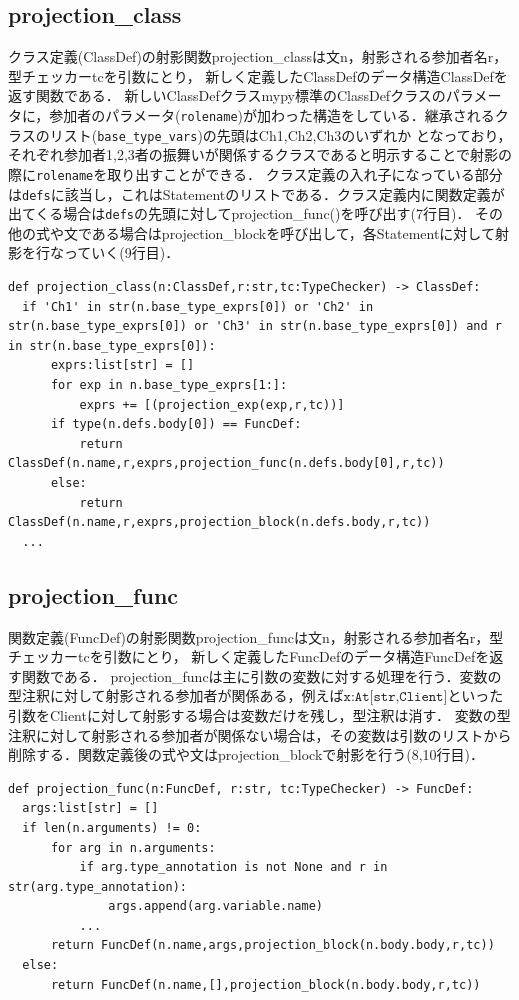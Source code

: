 \documentclass{thesis}
\begin{document}
\subsection{projection\_class}
クラス定義(ClassDef)の射影関数projection\_classは文\textsf{n}，射影される参加者名\textsf{r}，型チェッカー\textsf{tc}を引数にとり， 新しく定義したClassDefのデータ構造\textsf{ClassDef}を返す関数である．
新しいClassDefクラスmypy標準のClassDefクラスのパラメータに，参加者のパラメータ(\texttt{rolename})が加わった構造をしている．継承されるクラスのリスト(\texttt{base\_type\_vars})の先頭はCh1,Ch2,Ch3のいずれか
となっており，それぞれ参加者1,2,3者の振舞いが関係するクラスであると明示することで射影の際に\texttt{rolename}を取り出すことができる．
クラス定義の入れ子になっている部分は\texttt{defs}に該当し，これはStatementのリストである．クラス定義内に関数定義が出てくる場合は\texttt{defs}の先頭に対してprojection\_func()を呼び出す(7行目)．
その他の式や文である場合はprojection\_blockを呼び出して，各Statementに対して射影を行なっていく(9行目)．
\begin{lstlisting}[caption=pro\_class.py]
def projection_class(n:ClassDef,r:str,tc:TypeChecker) -> ClassDef:
  if 'Ch1' in str(n.base_type_exprs[0]) or 'Ch2' in str(n.base_type_exprs[0]) or 'Ch3' in str(n.base_type_exprs[0]) and r in str(n.base_type_exprs[0]):
      exprs:list[str] = []
      for exp in n.base_type_exprs[1:]:
          exprs += [(projection_exp(exp,r,tc))]
      if type(n.defs.body[0]) == FuncDef: 
          return ClassDef(n.name,r,exprs,projection_func(n.defs.body[0],r,tc))
      else: 
          return ClassDef(n.name,r,exprs,projection_block(n.defs.body,r,tc))
  ... 
\end{lstlisting}
\subsection{projection\_func}
関数定義(FuncDef)の射影関数projection\_funcは文\textsf{n}，射影される参加者名\textsf{r}，型チェッカー\textsf{tc}を引数にとり， 新しく定義したFuncDefのデータ構造\textsf{FuncDef}を返す関数である．
projection\_funcは主に引数の変数に対する処理を行う．変数の型注釈に対して射影される参加者が関係ある，例えば$\texttt{x:At[str,Client]}$といった引数をClientに対して射影する場合は変数だけを残し，型注釈は消す．
変数の型注釈に対して射影される参加者が関係ない場合は，その変数は引数のリストから削除する．関数定義後の式や文はprojection\_blockで射影を行う(8,10行目)．
\begin{lstlisting}[caption=pro\_func.py]
def projection_func(n:FuncDef, r:str, tc:TypeChecker) -> FuncDef:
  args:list[str] = []
  if len(n.arguments) != 0:
      for arg in n.arguments:
          if arg.type_annotation is not None and r in str(arg.type_annotation):
              args.append(arg.variable.name)
          ... 
      return FuncDef(n.name,args,projection_block(n.body.body,r,tc))
  else:
      return FuncDef(n.name,[],projection_block(n.body.body,r,tc))
\end{lstlisting}
\end{document}
